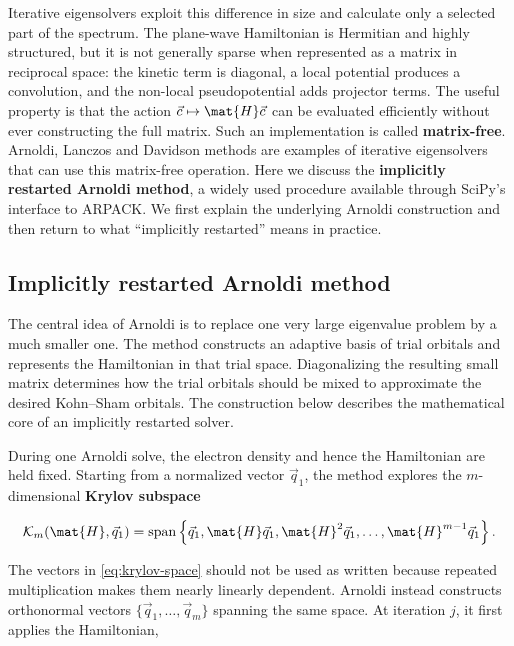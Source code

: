 Iterative eigensolvers exploit this difference in size and calculate only a selected part of the spectrum. The plane-wave Hamiltonian is Hermitian and highly structured, but it is not generally sparse when represented as a matrix in reciprocal space: the kinetic term is diagonal, a local potential produces a convolution, and the non-local pseudopotential adds projector terms. The useful property is that the action \(\vec{c}\mapsto\mat{H}\vec{c}\) can be evaluated efficiently without ever constructing the full matrix. Such an implementation is called \textbf{matrix-free}. Arnoldi, Lanczos and Davidson methods are examples of iterative eigensolvers that can use this matrix-free operation.\cite{1951:arnoldi,1975:davidson} Here we discuss the \textbf{implicitly restarted Arnoldi method}, a widely used procedure available through SciPy's interface to ARPACK.\cite{arnoldi_scipy} We first explain the underlying Arnoldi construction and then return to what ``implicitly restarted'' means in practice.

%
%
%
\subsection{Implicitly restarted Arnoldi method}

The central idea of Arnoldi is to replace one very large eigenvalue problem by a much smaller one. The method constructs an adaptive basis of trial orbitals and represents the Hamiltonian in that trial space. Diagonalizing the resulting small matrix determines how the trial orbitals should be mixed to approximate the desired Kohn--Sham orbitals. The construction below describes the mathematical core of an implicitly restarted solver.

During one Arnoldi solve, the electron density and hence the Hamiltonian are held fixed. Starting from a normalized vector \(\vec{q}_{1}\), the method explores the \(m\)-dimensional \textbf{Krylov subspace}

\begin{equation}
    \mathcal{K}_{m}(\mat{H},\vec{q}_{1}) =
    \operatorname{span}\left\{
    \vec{q}_{1},\mat{H}\vec{q}_{1},\mat{H}^{2}\vec{q}_{1},\ldots,
    \mat{H}^{m-1}\vec{q}_{1}\right\}.
    \label{eq:krylov-space}
\end{equation}

The vectors in \cref{eq:krylov-space} should not be used as written because repeated multiplication makes them nearly linearly dependent. Arnoldi instead constructs orthonormal vectors \(\{\vec{q}_{1},\ldots,\vec{q}_{m}\}\) spanning the same space. At iteration \(j\), it first applies the Hamiltonian,

